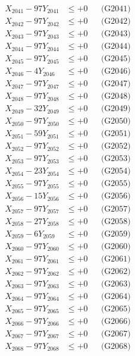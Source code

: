\documentclass[a4paper,10pt]{article}
\begin{document}
{\begin{align}
\allowbreak
X_{2041} - 97Y_{2041} &\leq +0 && \text{(G2041)} \\
X_{2042} - 97Y_{2042} &\leq +0 && \text{(G2042)} \\
X_{2043} - 97Y_{2043} &\leq +0 && \text{(G2043)} \\
X_{2044} - 97Y_{2044} &\leq +0 && \text{(G2044)} \\
X_{2045} - 97Y_{2045} &\leq +0 && \text{(G2045)} \\
X_{2046} - 4Y_{2046} &\leq +0 && \text{(G2046)} \\
X_{2047} - 97Y_{2047} &\leq +0 && \text{(G2047)} \\
X_{2048} - 97Y_{2048} &\leq +0 && \text{(G2048)} \\
X_{2049} - 32Y_{2049} &\leq +0 && \text{(G2049)} \\
X_{2050} - 97Y_{2050} &\leq +0 && \text{(G2050)} \\
\allowbreak
X_{2051} - 59Y_{2051} &\leq +0 && \text{(G2051)} \\
X_{2052} - 97Y_{2052} &\leq +0 && \text{(G2052)} \\
X_{2053} - 97Y_{2053} &\leq +0 && \text{(G2053)} \\
X_{2054} - 23Y_{2054} &\leq +0 && \text{(G2054)} \\
X_{2055} - 97Y_{2055} &\leq +0 && \text{(G2055)} \\
X_{2056} - 15Y_{2056} &\leq +0 && \text{(G2056)} \\
X_{2057} - 97Y_{2057} &\leq +0 && \text{(G2057)} \\
X_{2058} - 27Y_{2058} &\leq +0 && \text{(G2058)} \\
X_{2059} - 6Y_{2059} &\leq +0 && \text{(G2059)} \\
X_{2060} - 97Y_{2060} &\leq +0 && \text{(G2060)} \\
\allowbreak
X_{2061} - 97Y_{2061} &\leq +0 && \text{(G2061)} \\
X_{2062} - 97Y_{2062} &\leq +0 && \text{(G2062)} \\
X_{2063} - 97Y_{2063} &\leq +0 && \text{(G2063)} \\
X_{2064} - 97Y_{2064} &\leq +0 && \text{(G2064)} \\
X_{2065} - 97Y_{2065} &\leq +0 && \text{(G2065)} \\
X_{2066} - 97Y_{2066} &\leq +0 && \text{(G2066)} \\
X_{2067} - 97Y_{2067} &\leq +0 && \text{(G2067)} \\
X_{2068} - 97Y_{2068} &\leq +0 && \text{(G2068)} \\

\end{align}}
\end{document}
